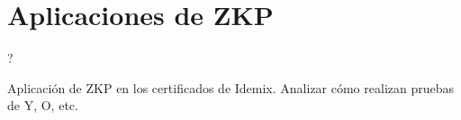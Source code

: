 \chapter{Aplicaciones de ZKP}\label{ch:aplicaciones} 

?

Aplicación de ZKP en los certificados de Idemix. Analizar cómo realizan pruebas de Y, O, etc.